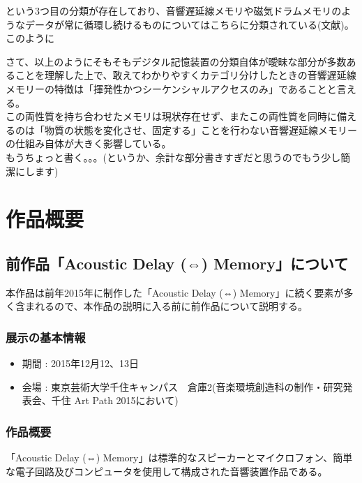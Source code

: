 \documentclass[a4paper,report]{jsbook}
\begin{document}
という3つ目の分類が存在しており、音響遅延線メモリや磁気ドラムメモリのようなデータが常に循環し続けるものについてはこちらに分類されている(文献)。このように

さて、以上のようにそもそもデジタル記憶装置の分類自体が曖昧な部分が多数あることを理解した上で、敢えてわかりやすくカテゴリ分けしたときの音響遅延線メモリーの特徴は「揮発性かつシーケンシャルアクセスのみ」であることと言える。\\
この両性質を持ち合わせたメモリは現状存在せず、またこの両性質を同時に備えるのは「物質の状態を変化させ、固定する」ことを行わない音響遅延線メモリーの仕組み自体が大きく影響している。\\
もうちょっと書く。。。(というか、余計な部分書きすぎだと思うのでもう少し簡潔にします)

\chapter{作品概要}\label{ux4f5cux54c1ux6982ux8981}

\section{前作品「Acoustic Delay (⇔)
Memory」について}\label{ux524dux4f5cux54c1acoustic-delay-memoryux306bux3064ux3044ux3066}

本作品は前年2015年に制作した「Acoustic Delay (⇔)
Memory」に続く要素が多く含まれるので、本作品の説明に入る前に前作品について説明する。

\subsection{展示の基本情報}\label{ux5c55ux793aux306eux57faux672cux60c5ux5831}

\begin{itemize}
\tightlist
\item
  期間 : 2015年12月12、13日
\item
  会場 :
  東京芸術大学千住キャンパス　倉庫2(音楽環境創造科の制作・研究発表会、千住
  Art Path 2015において)
\end{itemize}

\subsection{作品概要}\label{ux4f5cux54c1ux6982ux8981-1}

「Acoustic Delay (⇔)
Memory」は標準的なスピーカーとマイクロフォン、簡単な電子回路及びコンピュータを使用して構成された音響装置作品である。
\end{document}
